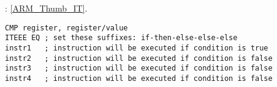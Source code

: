 : \ref{ARM_Thumb_IT}.

\begin{lstlisting}[caption=ARM (\ThumbMode)]
CMP register, register/value
ITEEE EQ ; set these suffixes: if-then-else-else-else
instr1   ; instruction will be executed if condition is true
instr2   ; instruction will be executed if condition is false
instr3   ; instruction will be executed if condition is false
instr4   ; instruction will be executed if condition is false
\end{lstlisting}
